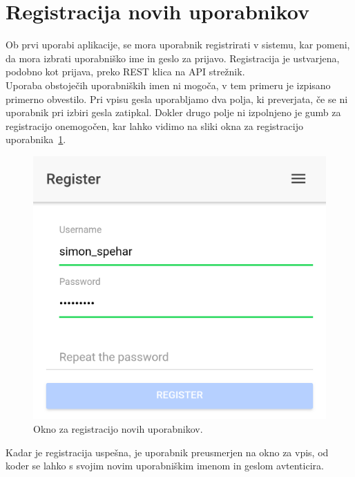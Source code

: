 \documentclass[a4paper, 12pt]{book}
\begin{document}
\section{Registracija novih uporabnikov}
Ob prvi uporabi aplikacije, se mora uporabnik registrirati v sistemu, kar pomeni, da mora izbrati uporabniško ime in geslo za prijavo. Registracija je ustvarjena, podobno kot prijava, preko REST klica na API strežnik.\\Uporaba obstoječih uporabniških imen ni mogoča, v tem primeru je izpisano primerno obvestilo. Pri vpisu gesla uporabljamo dva polja, ki preverjata, če se ni uporabnik pri izbiri gesla zatipkal. Dokler drugo polje ni izpolnjeno je gumb za registracijo onemogočen, kar lahko vidimo na sliki okna za registracijo uporabnika~\ref{mobile_register}.
\begin{figure}[H]
\centering
\includegraphics[height=0.55\textwidth]{slike/mobile_register}
\caption{Okno za registracijo novih uporabnikov.}\label{mobile_register}
\end{figure}
\noindent Kadar je registracija uspešna, je uporabnik preusmerjen na okno za vpis, od koder se lahko s svojim novim uporabniškim imenom in geslom avtenticira. 
\end{document}
